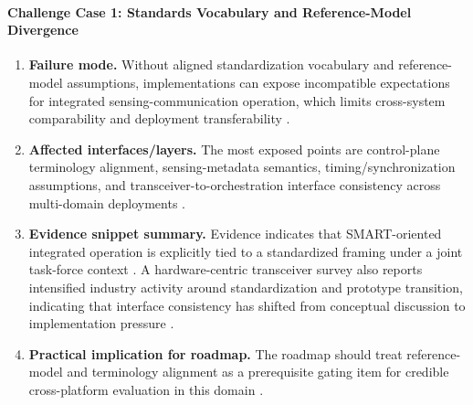 \documentclass[lettersize,journal]{IEEEtran}
\begin{document}
\paragraph{Challenge Case 1: Standards Vocabulary and Reference-Model Divergence}
\begin{enumerate}
    \item \textbf{Failure mode.} Without aligned standardization vocabulary and reference-model assumptions, implementations can expose incompatible expectations for integrated sensing-communication operation, which limits cross-system comparability and deployment transferability \cite{O_ISAC_220, O_ISAC_161}.
    \item \textbf{Affected interfaces/layers.} The most exposed points are control-plane terminology alignment, sensing-metadata semantics, timing/synchronization assumptions, and transceiver-to-orchestration interface consistency across multi-domain deployments \cite{O_ISAC_220, O_ISAC_161}.
    \item \textbf{Evidence snippet summary.} Evidence indicates that SMART-oriented integrated operation is explicitly tied to a standardized framing under a joint task-force context \cite{O_ISAC_220}. A hardware-centric transceiver survey also reports intensified industry activity around standardization and prototype transition, indicating that interface consistency has shifted from conceptual discussion to implementation pressure \cite{O_ISAC_161}.
    \item \textbf{Practical implication for roadmap.} The roadmap should treat reference-model and terminology alignment as a prerequisite gating item for credible cross-platform evaluation in this domain \cite{O_ISAC_220, O_ISAC_161}.
\end{enumerate}
\end{document}
